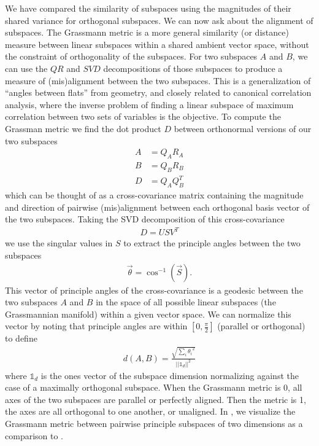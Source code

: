 \documentclass[../main.tex]{subfiles}
\begin{document}
We have compared the similarity of subspaces using the magnitudes of their shared variance for orthogonal subspaces. We can now ask about the alignment of subspaces. The Grassmann metric is a more general similarity (or distance) measure between linear subspaces within a shared ambient vector space, without the constraint of orthogonality of the subspaces\cite{eschenburg2022}. For two subspaces $A$ and $B$, we can use the $QR$ and $SVD$ decompositions of those subspaces to produce a measure of (mis)alignment between the two subspaces. This is a generalization of ``angles between flats'' from geometry, and closely related to canonical correlation analysis, where the inverse problem of finding a linear subspace of maximum correlation between two sets of variables is the objective. To compute the Grassman metric we find the dot product $D$ between orthonormal versions of our two subspaces
%
\begin{align}
  A &= Q_AR_A \\ 
  B &= Q_BR_B \\
  D &= Q_AQ_B^T
\end{align}
%
which can be thought of as a cross-covariance matrix containing the magnitude and direction of pairwise (mis)alignment between each orthogonal basis vector of the two subspaces. Taking the SVD decomposition of this cross-covariance
%
\begin{align}
  D = USV^T
\end{align}
%
we use the singular values in $S$ to extract the principle angles between the two subspaces
%
\begin{align}
  \vec{\theta} = \cos^{-1}({\vec{S}}).
\end{align}
%
This vector of principle angles of the cross-covariance is a geodesic between the two subspaces $A$ and $B$ in the space of all possible linear subspaces (the Grassmannian manifold) within a given vector space. We can normalize this vector by noting that principle angles are within $[0,\frac{\pi}{2}]$ (parallel or orthogonal) to define
%
\begin{align}
  d(A,B) = \frac{\sqrt{\sum_{i}^{}{{\theta_i}^2}}}{||\mathbb{1}_d||^2}
\end{align}
%
where $\mathbb{1}_d$ is the ones vector of the subspace dimension normalizing against the case of a maximally orthogonal subspace. When the Grassmann metric is 0, all axes of the two subspaces are parallel or perfectly aligned. Then the metric is 1, the axes are all orthogonal to one another, or unaligned. In , we visualize the Grassmann metric between pairwise principle subspaces of two dimensions as a comparison to .
\end{document}
